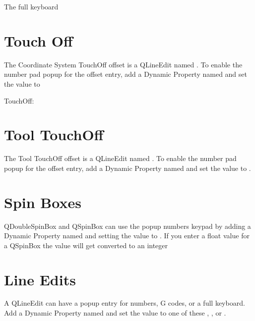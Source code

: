\documentclass[letterpaper,10pt,english]{sphinxmanual}
\begin{document}
\sphinxAtStartPar
The full keyboard



\section{Touch Off}
\label{\detokenize{touch:touch-off}}
\sphinxAtStartPar
The Coordinate System Touch\sphinxhyphen{}Off offset is a QLineEdit named .
To enable the number pad popup for the offset entry, add a Dynamic Property
named  and set the value to 


\sphinxAtStartPar
Touch\sphinxhyphen{}Off:



\section{Tool Touch\sphinxhyphen{}Off}
\label{\detokenize{touch:tool-touch-off}}
\sphinxAtStartPar
The Tool Touch\sphinxhyphen{}Off offset is a QLineEdit named . To enable
the number pad popup for the offset entry, add a Dynamic Property named
 and set the value to .


\section{Spin Boxes}
\label{\detokenize{touch:spin-boxes}}
\sphinxAtStartPar
QDoubleSpinBox and QSpinBox can use the popup numbers keypad by adding a
Dynamic Property named  and setting the value to . If you enter
a float value for a QSpinBox the value will get converted to an integer


\section{Line Edits}
\label{\detokenize{touch:line-edits}}
\sphinxAtStartPar
A QLineEdit can have a popup entry for numbers, G codes, or a full keyboard.
Add a Dynamic Property named  and set the value to one of these
, , or .
\end{document}
